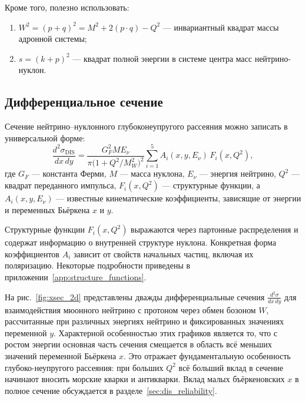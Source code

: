 Кроме того, полезно использовать:
\begin{enumerate}
  \item \( W^2 = (p + q)^2 = M^2 + 2(p \cdot q) - Q^2 \) — инвариантный квадрат массы адронной системы;
  \item \( s = (k + p)^2 \) — квадрат полной энергии в системе центра масс нейтрино-нуклон.
\end{enumerate}

\subsection{Дифференциальное сечение}

Сечение нейтрино–нуклонного глубоконеупругого рассеяния можно записать в универсальной форме:
\begin{equation}
  \frac{d^2 \sigma_{\text{DIS}}}{dx\,dy} =
  \frac{G_F^2 M E_\nu}{\pi \bigl(1 + Q^2/M_W^2\bigr)^2}
  \sum_{i=1}^{5} A_i(x, y, E_\nu)\, F_i(x, Q^2),
  \label{eq:xsec_general}
\end{equation}
где \( G_F \) — константа Ферми, \( M \) — масса нуклона, \( E_\nu \) — энергия нейтрино, \( Q^2 \) — квадрат переданного импульса, \( F_i(x, Q^2) \) — структурные функции, а \( A_i(x, y, E_\nu) \) — известные кинематические коэффициенты, зависящие от энергии и переменных Бьёркена \( x \) и \( y \).

Структурные функции \( F_i(x, Q^2) \) выражаются через партонные распределения и содержат информацию о внутренней структуре нуклона. Конкретная форма коэффициентов \( A_i \) зависит от свойств начальных частиц, включая их поляризацию. Некоторые подробности приведены в приложении~\ref{app:structure_functions}.

На рис.~\ref{fig:xsec_2d} представлены дважды дифференциальные сечения $\frac{d^2\sigma}{dx\,dy}$ для взаимодействия мюонного нейтрино с протоном через обмен бозоном $W$, рассчитанные при различных энергиях нейтрино и фиксированных значениях переменной $y$. Характерной особенностью этих графиков является то, что с ростом энергии основная часть сечения смещается в область всё меньших значений переменной Бьёркена $x$. Это отражает фундаментальную особенность глубоко-неупругого рассеяния: при больших $Q^2$ всё больший вклад в сечение начинают вносить морские кварки и антикварки. Вклад малых бъёркеновских $x$ в полное сечение обсуждается в разделе~\ref{sec:dis_reliability}.

